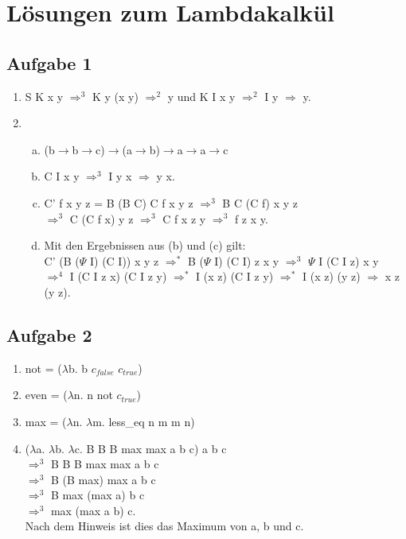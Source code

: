 \documentclass{scrartcl}
\renewcommand{\l}{$\lambda$}
\begin{document}
\section*{Lösungen zum Lambdakalkül}
\subsection*{Aufgabe 1}
\begin{enumerate}[1.]
\item S K x y $\Rightarrow^3$ K y (x y) $\Rightarrow^2$ y und K I x y $\Rightarrow^2$ I y $\Rightarrow$ y.
\item
\begin{enumerate}[(a)]
\item (b$\to$b$\to$c)$\to$(a$\to$b)$\to$a$\to$a$\to$c
\item C I x y $\Rightarrow^3$  I y x $\Rightarrow$ y x.
\item C' f x y z = B (B C) C f x y z $\Rightarrow^3$ B C (C f) x y z \\$\Rightarrow^3$ C (C f x) y z $\Rightarrow^3$ C f x z y $\Rightarrow^3$ f z x y.
\item Mit den Ergebnissen aus (b) und (c) gilt:\\
C' (B ($\Psi$ I) (C I)) x y z $\Rightarrow^*$ B ($\Psi$ I) (C I) z x y $\Rightarrow^3$
$\Psi$ I (C I z) x y\\ $\Rightarrow^4$ I (C I z x) (C I z y) $\Rightarrow^*$ I (x z) (C I z y) $\Rightarrow^*$ I (x z) (y z) $\Rightarrow$ x z (y z).
\end{enumerate}
\end{enumerate}

\subsection*{Aufgabe 2}
\begin{enumerate}
\item not = (\l b. b $c_{false}$ $c_{true}$)
\item even = (\l n. n not $c_{true}$)
\item max = (\l n. \l m. less\_eq n m m n)
\item (\l a. \l b. \l c. B B B max max a b c) a b c \\$\Rightarrow^3$ B B B max max a b c \\$\Rightarrow^3$ B (B max) max a b c \\$\Rightarrow^3$ B max (max a) b c\\ $\Rightarrow^3$ max (max a b) c.\\
Nach dem Hinweis ist dies das Maximum von a, b und c.
\end{enumerate}
\end{document}
